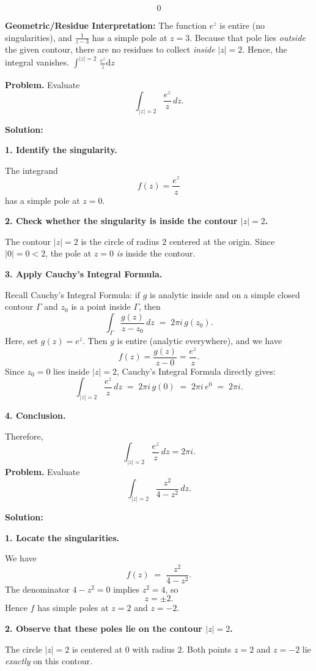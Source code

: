 \documentclass[12pt]{article}
\theoremstyle{definition} %
\theoremstyle{plain} %
\begin{document}
\[
\boxed{0}
\]

\textbf{Geometric/Residue Interpretation:} 
The function \(e^z\) is entire (no singularities), and \(\frac{1}{z-3}\) has a simple pole at \(z=3\). Because that pole lies \emph{outside} the given contour, there are no residues to collect \emph{inside} \(\lvert z\rvert=2\). Hence, the integral vanishes.
$\int_{}^{\left\vert z \right\vert =2}  \,\frac{e^{z}}{z}\mathrm{d}z $

\textbf{Problem.} Evaluate
\[
\int_{\lvert z\rvert = 2} \frac{e^z}{z}\,dz.
\]

\textbf{Solution:}

\textbf{1. Identify the singularity.}

The integrand
\[
f(z) = \frac{e^z}{z}
\]
has a simple pole at \(z = 0\). 

\textbf{2. Check whether the singularity is inside the contour \(\lvert z\rvert=2\).}

The contour \(\lvert z\rvert=2\) is the circle of radius \(2\) centered at the origin. Since \(\lvert 0\rvert=0 < 2\), the pole at \(z=0\) \emph{is} inside the contour.

\textbf{3. Apply Cauchy’s Integral Formula.}

Recall Cauchy’s Integral Formula: if \(g\) is analytic inside and on a simple closed contour \(\Gamma\) and \(z_0\) is a point inside \(\Gamma\), then
\[
\int_{\Gamma} \frac{g(z)}{z - z_0}\,dz \;=\; 2\pi i \,g(z_0).
\]
Here, set \(g(z) = e^z\). Then \(g\) is entire (analytic everywhere), and we have
\[
f(z) = \frac{g(z)}{z - 0} = \frac{e^z}{z}.
\]
Since \(z_0 = 0\) lies inside \(\lvert z\rvert=2\), Cauchy’s Integral Formula directly gives:
\[
\int_{\lvert z\rvert = 2} \frac{e^z}{z}\,dz 
\;=\;
2\pi i\,g(0)
\;=\;
2\pi i\,e^0
\;=\;
2\pi i.
\]

\textbf{4. Conclusion.}

Therefore,
\[
\boxed{
\int_{\lvert z\rvert = 2} \frac{e^z}{z}\,dz = 2\pi i.
}
\]
\textbf{Problem.} Evaluate
\[
\int_{\lvert z\rvert=2} \frac{z^2}{4 - z^2}\,dz.
\]

\textbf{Solution:}

\textbf{1. Locate the singularities.}

We have
\[
f(z) \;=\;\frac{z^2}{4 - z^2}.
\]
The denominator \(4 - z^2 = 0\) implies \(z^2 = 4\), so
\[
z = \pm 2.
\]
Hence \(f\) has simple poles at \(z=2\) and \(z=-2\).

\textbf{2. Observe that these poles lie on the contour \(\lvert z\rvert=2\).}

The circle \(\lvert z\rvert=2\) is centered at \(0\) with radius \(2\).  Both points \(z=2\) and \(z=-2\) lie \emph{exactly} on this contour.
\end{document}
